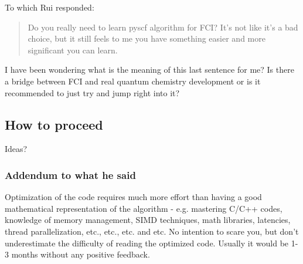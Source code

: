 \documentclass[12pt]{article}
\begin{document}
To which Rui responded:

\begin{quote}
Do you really need to learn pyscf algorithm for FCI? It's not like it's a bad choice, but it still feels to me you have something easier and more significant you can learn.
\end{quote}

I have been wondering what is the meaning of this last sentence for me? Is there a bridge between FCI and real quantum chemistry development or is it recommended to just try and jump right into it?
\subsection{How to proceed}
Ideas?
\subsubsection{Addendum to what he said}
Optimization of the code requires much more effort than having a good mathematical representation of the algorithm - e.g. mastering C/C++ codes, knowledge of memory management, SIMD techniques, math libraries, latencies, thread parallelization, etc., etc., etc. and etc. No intention to scare you, but don't underestimate the difficulty of reading the optimized code. Usually it would be 1-3 months without any positive feedback.
\end{document}
